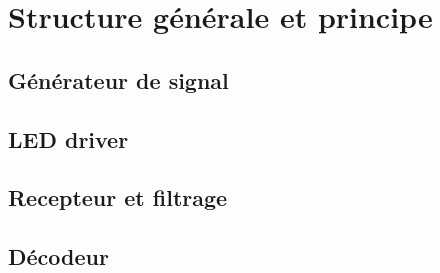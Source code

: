 \newpage
\section{Structure générale et principe}



\subsection{Générateur de signal}

\subsection{LED driver}

\subsection{Recepteur et filtrage}

\subsection{Décodeur}
